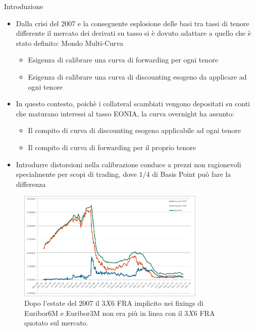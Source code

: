 \titlepageframe %
\begin{tframe}{Introduzione}
\begin{itemize}
\item Dalla crisi del 2007 e la conseguente esplosione delle basi tra tassi di tenore differente il mercato dei derivati su tasso si è dovuto adattare a quello che è stato definito: Mondo Multi-Curva
    \begin{itemize}
    \item Esigenza di calibrare una curva di forwarding per ogni tenore
    \item Esigenza di calibrare una curva di discounting esogeno da applicare ad ogni tenore
    \end{itemize}
\item In questo contesto, poichè i collateral scambiati vengono depositati su conti che maturano interessi al tasso EONIA, la curva overnight ha assunto:
   \begin{itemize}
    \item Il compito di curva di discounting esogeno applicabile ad ogni tenore
    \item Il compito di curva di forwarding per il proprio tenore
    \end{itemize}
\item Introdurre distorsioni nella calibrazione conduce a prezzi non ragionevoli specialmente per scopi di trading, dove $1/4$ di Basis Point può fare la differenza    
\end{itemize}
\end{tframe}
\begin{tframe}
\begin{figure}[!h]
\centering
\includegraphics[width=0.8\textwidth]{basisafter}
\caption{Dopo l'estate del 2007 il  $3X6$ FRA implicito nei fixings di Euribor6M e Euribor3M non era più in linea con il $3X6$ FRA quotato sul mercato.}
\label{fig:basisafter}
\end{figure}
\end{tframe}
